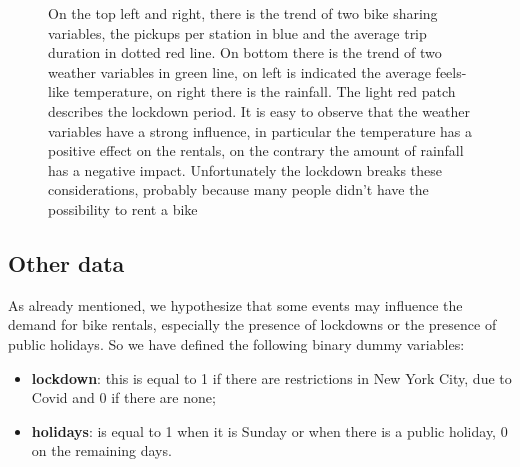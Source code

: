 \begin{figure}[h!]
	\quad
	\caption{On the top left and right, there is the trend of two bike sharing variables, the pickups per station in blue and the average trip duration in dotted red line. On bottom there is the trend of two weather variables in green line, on left is indicated the average feels-like temperature, on right there is the rainfall. The light red patch describes the lockdown period. It is easy to observe that the weather variables have a strong influence, in particular the temperature has a positive effect on the rentals, on the contrary the amount of rainfall has a negative impact. Unfortunately the lockdown breaks these considerations, probably because many people didn't have the possibility to rent a bike}
\end{figure}

\subsection{Other data}
As already mentioned, we hypothesize that some events may influence the demand for bike rentals, especially the presence of lockdowns or the presence of public holidays. So we have defined the following binary dummy variables:
\begin{itemize}
	\item \textbf{lockdown}: this is equal to \num{1} if there are restrictions in New York City, due to Covid and \num{0} if there are none;
	\item \textbf{holidays}: is equal to \num{1} when it is Sunday or when there is a public holiday, \num{0} on the remaining days.
\end{itemize}
